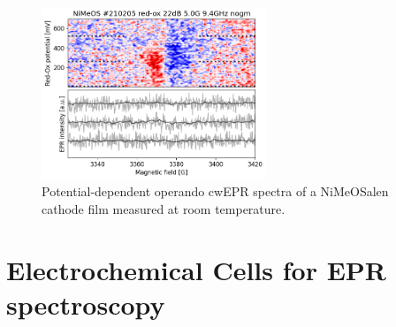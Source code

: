 \begin{figure}[!ht]
\center
	\includegraphics[width=0.6\textwidth]{./operando_epr/figures/backbone/NiMeOS_lyra_overnight_RT.png}
	\caption{Potential-dependent operando cwEPR spectra of a NiMeOSalen cathode film measured at room temperature.}
	\label{fig:cwEPR_RT_NiSalen_OPERANDO}
\end{figure}


\section{Electrochemical Cells for EPR spectroscopy}
\label{sec:operando_cell_fab}

